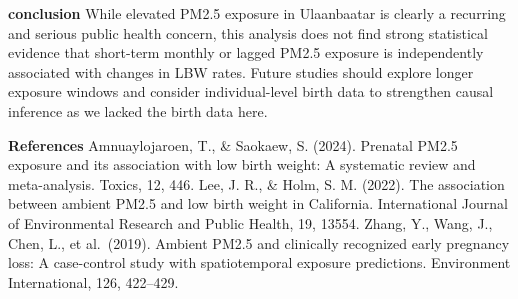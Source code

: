 \documentclass[
]{article}
\begin{document}
\textbf{conclusion} While elevated PM2.5 exposure in Ulaanbaatar is
clearly a recurring and serious public health concern, this analysis
does not find strong statistical evidence that short-term monthly or
lagged PM2.5 exposure is independently associated with changes in LBW
rates. Future studies should explore longer exposure windows and
consider individual-level birth data to strengthen causal inference as
we lacked the birth data here.

\textbf{References} Amnuaylojaroen, T., \& Saokaew, S. (2024). Prenatal
PM2.5 exposure and its association with low birth weight: A systematic
review and meta-analysis. Toxics, 12, 446. Lee, J. R., \& Holm, S. M.
(2022). The association between ambient PM2.5 and low birth weight in
California. International Journal of Environmental Research and Public
Health, 19, 13554. Zhang, Y., Wang, J., Chen, L., et al.~(2019). Ambient
PM2.5 and clinically recognized early pregnancy loss: A case-control
study with spatiotemporal exposure predictions. Environment
International, 126, 422--429.
\end{document}
